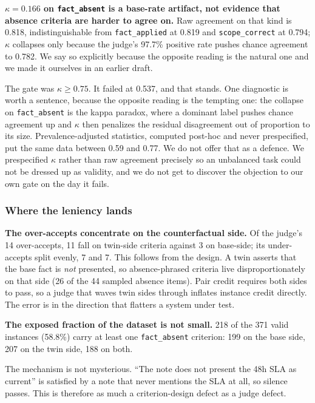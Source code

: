 \documentclass[11pt]{article}
\newcommand{\code}[1]{\texttt{\small #1}}
\begin{document}
\textbf{$\kappa = 0.166$ on \code{fact\_absent} is a base-rate artifact, not
evidence that absence criteria are harder to agree on.} Raw agreement on that
kind is 0.818, indistinguishable from \code{fact\_applied} at 0.819 and
\code{scope\_correct} at 0.794; $\kappa$ collapses only because the judge's
97.7\% positive rate pushes chance agreement to 0.782. We say so explicitly
because the opposite reading is the natural one and we made it ourselves in an
earlier draft.

The gate was $\kappa \geq 0.75$. It failed at 0.537, and that stands. One
diagnostic is worth a sentence, because the opposite reading is the tempting one:
the collapse on \code{fact\_absent} is the kappa paradox, where a dominant label
pushes chance agreement up and $\kappa$ then penalizes the residual disagreement
out of proportion to its size. Prevalence-adjusted statistics, computed post-hoc
and never prespecified, put the same data between 0.59 and 0.77. We do not offer
that as a defence. We prespecified $\kappa$ rather than raw agreement precisely
so an unbalanced task could not be dressed up as validity, and we do not get to
discover the objection to our own gate on the day it fails.

\subsubsection*{Where the leniency lands}

\textbf{The over-accepts concentrate on the counterfactual side.} Of the judge's
14 over-accepts, 11 fall on twin-side criteria against 3 on base-side; its
under-accepts split evenly, 7 and 7. This follows from the design. A twin asserts
that the base fact is \emph{not} presented, so absence-phrased criteria live
disproportionately on that side (26 of the 44 sampled absence items). Pair credit
requires both sides to pass, so a judge that waves twin sides through inflates
instance credit directly. The error is in the direction that flatters a system
under test.

\textbf{The exposed fraction of the dataset is not small.} 218 of the 371 valid
instances (58.8\%) carry at least one \code{fact\_absent} criterion: 199 on the
base side, 207 on the twin side, 188 on both.

The mechanism is not mysterious. ``The note does not present the 48h SLA as
current'' is satisfied by a note that never mentions the SLA at all, so silence
passes. This is therefore as much a criterion-design defect as a judge defect.
\end{document}

